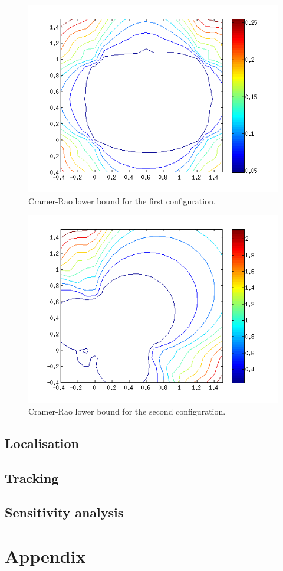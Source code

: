 \documentclass[10pt,a4paper]{report}
\begin{document}
\begin{figure}[H]
\begin{center}
  \includegraphics[width = 350pt]{crlb_good.png}
  \caption{Cramer-Rao lower bound for the first configuration.}
  \label{crlb_good}
  \end{center}
\end{figure}

\begin{figure}[H]
\begin{center}
  \includegraphics[width = 350pt]{crlb_bad.png}
  \caption{Cramer-Rao lower bound for the second configuration.}
  \label{crlb_bad}
  \end{center}
\end{figure}


\newpage
\section{Localisation}
\label{Localisationg}

\newpage
\section{Tracking}
\label{Tracking}

\newpage
\section{Sensitivity analysis}
\label{Sensitivity analysis}

\chapter{Appendix}
\end{document}
